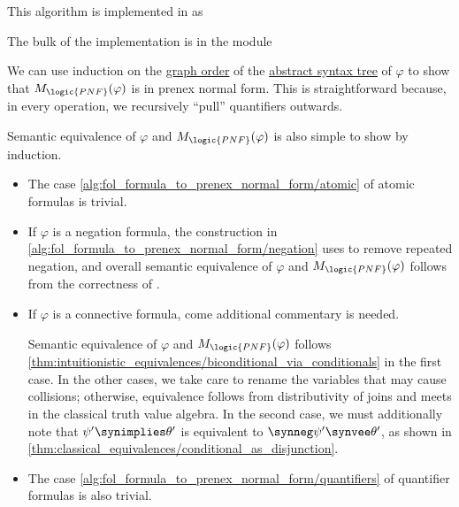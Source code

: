 \begin{comments}
  \item This algorithm is implemented in \cite{notebook:code} as
  \begin{CodeRefDisplay}
  \end{CodeRefDisplay}

  The bulk of the implementation is in the module
  \begin{CodeRefDisplay}
  \end{CodeRefDisplay}
\end{comments}
\begin{defproof}
  We can use induction on the \hyperref[def:graph_cardinality/order]{graph order} of the \hyperref[def:fol_formula_ast]{abstract syntax tree} of \( \varphi \) to show that \( M_{\logic{PNF}}(\varphi) \) is in prenex normal form. This is straightforward because, in every operation, we recursively \enquote{pull} quantifiers outwards.

  Semantic equivalence of \( \varphi \) and \( M_{\logic{PNF}}(\varphi) \) is also simple to show by induction.
  \begin{itemize}
    \item The case \ref{alg:fol_formula_to_prenex_normal_form/atomic} of atomic formulas is trivial.

    \item If \( \varphi \) is a negation formula, the construction in \ref{alg:fol_formula_to_prenex_normal_form/negation} uses  to remove repeated negation, and overall semantic equivalence of \( \varphi \) and \( M_{\logic{PNF}}(\varphi) \) follows from the correctness of .

    \item If \( \varphi \) is a connective formula, come additional commentary is needed.

    Semantic equivalence of \( \varphi \) and \( M_{\logic{PNF}}(\varphi) \) follows \cref{thm:intuitionistic_equivalences/biconditional_via_conditionals} in the first case. In the other cases, we take care to rename the variables that may cause collisions; otherwise, equivalence follows from distributivity of joins and meets in the classical truth value algebra. In the second case, we must additionally note that \( \psi' \synimplies \theta' \) is equivalent to \( \synneg \psi' \synvee \theta' \), as shown in \cref{thm:classical_equivalences/conditional_as_disjunction}.

    \item The case \ref{alg:fol_formula_to_prenex_normal_form/quantifiers} of quantifier formulas is also trivial.
  \end{itemize}
\end{defproof}

